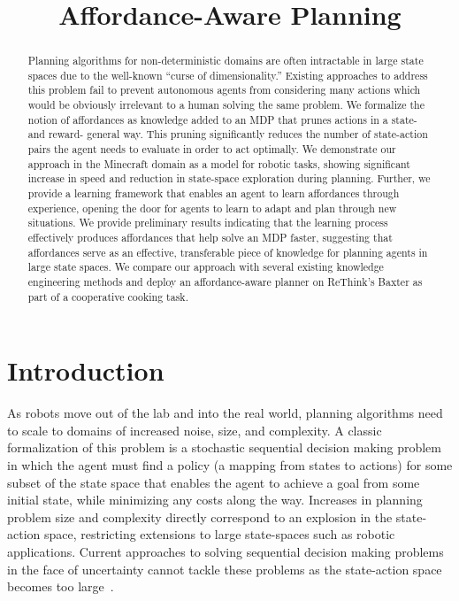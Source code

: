 \documentclass[conference]{IEEEtran}
\begin{document}
\title{Affordance-Aware Planning}

\author{
}

\maketitle

\begin{abstract}
Planning algorithms for non-deterministic domains are often
intractable in large state spaces due to the well-known ``curse of
dimensionality.''  Existing approaches to address this problem fail to prevent autonomous agents
from considering many actions which would be obviously irrelevant to a
human solving the same problem. We formalize the notion of affordances
as knowledge added to an MDP that prunes actions in a state- and
reward- general way. This pruning significantly reduces the number of
state-action pairs the agent needs to evaluate in order to act
optimally. We demonstrate our approach in the Minecraft domain as a
model for robotic tasks, showing significant increase in speed and
reduction in state-space exploration during planning. Further, we
provide a learning framework that enables an agent to learn
affordances through experience, opening the door for agents to learn
to adapt and plan through new situations. We provide preliminary
results indicating that the learning process effectively produces
affordances that help solve an MDP faster, suggesting that affordances
serve as an effective, transferable piece of knowledge for planning
agents in large state spaces. We compare our approach with several
existing knowledge engineering methods and deploy an affordance-aware planner
on ReThink's Baxter as part of a cooperative cooking task.

\end{abstract}

\IEEEpeerreviewmaketitle

\section{Introduction}
\label{sec:introduction}

As robots move out of the lab and into the real world, planning
algorithms need to scale to domains of increased noise, size, and
complexity.  A classic formalization of this problem is a stochastic
sequential decision making problem in which the agent must find a
policy (a mapping from states to actions) for some subset of the state
space that enables the agent to achieve a goal from some initial
state, while minimizing any costs along the way.
Increases in planning problem size and complexity directly correspond
to an explosion in the state-action space, restricting extensions to large state-spaces
such as robotic applications. Current approaches to solving 
sequential decision making problems in the face of uncertainty cannot tackle these problems 
as the state-action space becomes too large~\cite{grounds05}.
\end{document}
